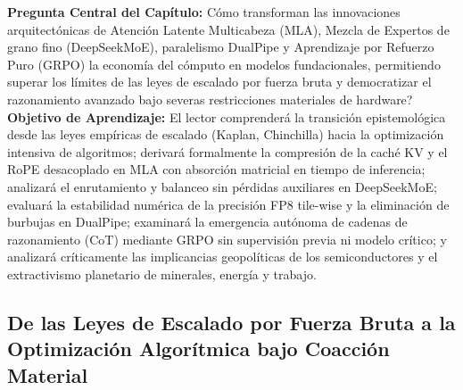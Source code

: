 \begin{cajabeige}
\textbf{Pregunta Central del Capítulo:} \textquestiondown Cómo transforman las innovaciones arquitectónicas de Atención Latente Multicabeza (MLA), Mezcla de Expertos de grano fino (DeepSeekMoE), paralelismo DualPipe y Aprendizaje por Refuerzo Puro (GRPO) la economía del cómputo en modelos fundacionales, permitiendo superar los límites de las leyes de escalado por fuerza bruta y democratizar el razonamiento avanzado bajo severas restricciones materiales de hardware?\\[0.3cm]
\textbf{Objetivo de Aprendizaje:} El lector comprenderá la transición epistemológica desde las leyes empíricas de escalado (Kaplan, Chinchilla) hacia la optimización intensiva de algoritmos; derivará formalmente la compresión de la caché KV y el RoPE desacoplado en MLA con absorción matricial en tiempo de inferencia; analizará el enrutamiento y balanceo sin pérdidas auxiliares en DeepSeekMoE; evaluará la estabilidad numérica de la precisión FP8 tile-wise y la eliminación de burbujas en DualPipe; examinará la emergencia autónoma de cadenas de razonamiento (CoT) mediante GRPO sin supervisión previa ni modelo crítico; y analizará críticamente las implicancias geopolíticas de los semiconductores y el extractivismo planetario de minerales, energía y trabajo.
\end{cajabeige}


\vspace{0.4cm}

\subsection{De las Leyes de Escalado por Fuerza Bruta a la Optimización Algorítmica bajo Coacción Material}

